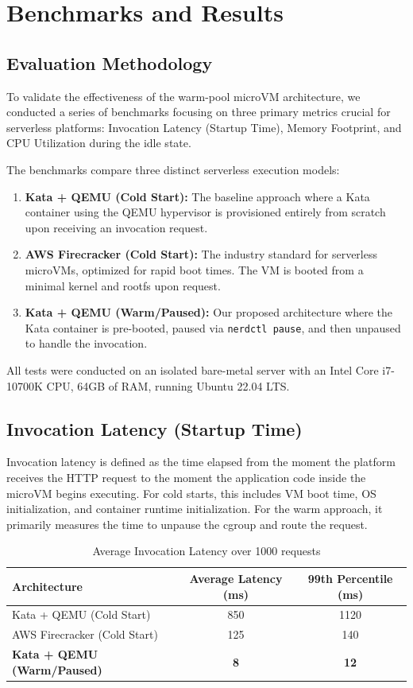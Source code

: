 \chapter{Benchmarks and Results}

\section{Evaluation Methodology}
To validate the effectiveness of the warm-pool microVM architecture, we conducted a series of benchmarks focusing on three primary metrics crucial for serverless platforms: Invocation Latency (Startup Time), Memory Footprint, and CPU Utilization during the idle state.

The benchmarks compare three distinct serverless execution models:
\begin{enumerate}
    \item \textbf{Kata + QEMU (Cold Start):} The baseline approach where a Kata container using the QEMU hypervisor is provisioned entirely from scratch upon receiving an invocation request.
    \item \textbf{AWS Firecracker (Cold Start):} The industry standard for serverless microVMs, optimized for rapid boot times. The VM is booted from a minimal kernel and rootfs upon request.
    \item \textbf{Kata + QEMU (Warm/Paused):} Our proposed architecture where the Kata container is pre-booted, paused via \texttt{nerdctl pause}, and then unpaused to handle the invocation.
\end{enumerate}

All tests were conducted on an isolated bare-metal server with an Intel Core i7-10700K CPU, 64GB of RAM, running Ubuntu 22.04 LTS.

\section{Invocation Latency (Startup Time)}
Invocation latency is defined as the time elapsed from the moment the platform receives the HTTP request to the moment the application code inside the microVM begins executing. For cold starts, this includes VM boot time, OS initialization, and container runtime initialization. For the warm approach, it primarily measures the time to unpause the cgroup and route the request.

\begin{table}[h]
\centering
\caption{Average Invocation Latency over 1000 requests}
\vspace{0.2cm}
\begin{tabularx}{0.8\textwidth}{X c c}
\toprule
\textbf{Architecture} & \textbf{Average Latency (ms)} & \textbf{99th Percentile (ms)} \\
\midrule
Kata + QEMU (Cold Start) & 850 & 1120 \\
AWS Firecracker (Cold Start) & 125 & 140 \\
\textbf{Kata + QEMU (Warm/Paused)} & \textbf{8} & \textbf{12} \\
\bottomrule
\end{tabularx}
\label{tab:latency}
\end{table}

